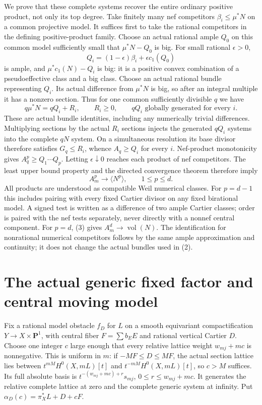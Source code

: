 \documentclass[10pt]{article}
\newcommand{\vol}{\operatorname{vol}}
\begin{document}
We prove that these complete systems recover the entire ordinary
positive product, not only its top degree. Take finitely many nef
competitors $\beta_i\leq\mu^*N$ on a common projective model. It
suffices first to take the rational competitors in the defining
positive-product family. Choose an actual rational ample $Q_0$ on
this common model sufficiently small that $\mu^*N-Q_0$ is big.
For small rational $\epsilon>0$,
\[
 Q_i=(1-\epsilon)\beta_i+\epsilon c_1(Q_0)
\]
is ample, and $\mu^*c_1(N)-Q_i$ is big: it is a positive convex
combination of a pseudoeffective class and a big class. Choose an
actual rational bundle representing $Q_i$. Its actual difference
from $\mu^*N$ is big, so after an integral multiple it has a nonzero
section. Thus for one common sufficiently divisible $q$ we have
\[
 q\mu^*N=qQ_i+R_i,\qquad R_i\geq0,
       \qquad qQ_i\text{ globally generated for every }i.          \tag{2}
\]
These are actual bundle identities, including any numerically trivial
differences. Multiplying sections by the actual $R_i$ sections injects
the generated $qQ_i$ systems into the complete $qN$ system.
On a simultaneous resolution its base divisor therefore satisfies
$G_q\leq R_i$, whence $A_q\geq Q_i$ for every $i$.
Nef-product monotonicity gives $A_q^p\geq Q_1\cdots Q_p$.
Letting $\epsilon\downarrow0$ reaches each product of nef competitors.
The least upper bound property and the directed convergence theorem
therefore imply
\[
 A_m^p\longrightarrow\langle N^p\rangle,
                      \qquad 1\leq p\leq d.             \tag{3}
\]
All products are understood as compatible Weil numerical classes.
For $p=d-1$ this includes pairing with every fixed Cartier divisor
on any fixed birational model. A signed test is written as a difference
of two ample Cartier classes; order is paired with the nef tests
separately, never directly with a nonnef central component.
For $p=d$, (3) gives $A_m^d\to\vol(N)$.
The identification for nonrational numerical competitors follows by
the same ample approximation and continuity; it does not change the
actual bundles used in (2).

\section{The actual generic fixed factor and central moving model}
Fix a rational model obstacle $f_D$ for $L$ on a smooth equivariant
compactification $Y\to X\times\mathbf P^1$,
with central fiber $F=\sum b_EE$ and rational vertical Cartier $D$.
Choose one integer $c$ large enough that every relative lattice weight
$w_{mj}+mc$ is nonnegative. This is uniform in $m$: if $-MF\leq D\leq MF$,
the actual section lattice lies between $t^{mM}H^0(X,mL)[t]$ and
$t^{-mM}H^0(X,mL)[t]$, so $c>M$ suffices. Its full absolute basis is
$t^{-(w_{mj}+mc)+r}s_{mj}$, $0\leq r\leq w_{mj}+mc$.
It generates the relative complete lattice at zero and the complete
generic system at infinity. Put $\alpha_D(c)=\pi_X^*L+D+cF$.
\end{document}
